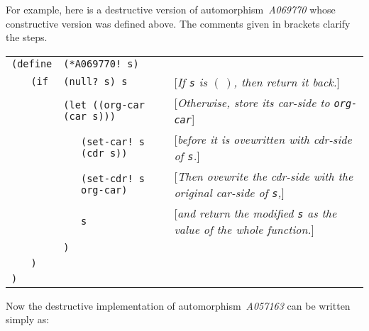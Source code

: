 \documentclass[11pt]{article} %
\newcommand{\autname}[1]{{\it *#1}}
\newcommand{\automorphism}[1]{automorphism~\autname{#1}}
\newcommand{\scmsym}[1]{{\tt{#1}}}
\newcommand{\scmcode}[1]{{\tt{#1}}}
\newenvironment{scmdefinefun5}{\begin{tabular}{l l l l p{5cm}}}{\end{tabular}}
\newcommand{\scmexmcomment}[1]{[\emph{#1}]}
\newcommand{\nilatom}{\ensuremath{\mathbf{(~)}}\xspace}
\begin{document}
For example, here is a destructive version of
\automorphism{A069770} whose constructive version
was defined above. The comments given in brackets
clarify the steps.


\begin{scmdefinefun5}

\multicolumn{2}{l}{\scmcode{(define}} & \multicolumn{2}{l}{\scmcode{(*A069770! s)}}\\
 & \scmcode{(if} & \multicolumn{2}{l}{\scmcode{(null? s) s}}
& \scmexmcomment{If \scmsym{s} is \nilatom, then return
  it back.}\\
 &               & \multicolumn{2}{l}{\scmcode{(let ((org-car (car s)))}}
& \scmexmcomment{Otherwise, store its car-side to \scmsym{org-car}}\\

 & &  & \scmcode{(set-car! s (cdr s))}
& \scmexmcomment{before it is ovewritten with cdr-side of \scmsym{s}.}\\
 & &  & \scmcode{(set-cdr! s org-car)}
& \scmexmcomment{Then ovewrite the cdr-side with the original
  car-side of \scmsym{s},}\\
 & &  & \scmcode{s}
& \scmexmcomment{and return the modified \scmsym{s} as the value of
  the whole function.}\\

& & \scmcode{)}\\
& \scmcode{)}\\
\scmcode{)}\\

\end{scmdefinefun5}


Now the destructive implementation of \automorphism{A057163} can be written
simply as:
\end{document}
